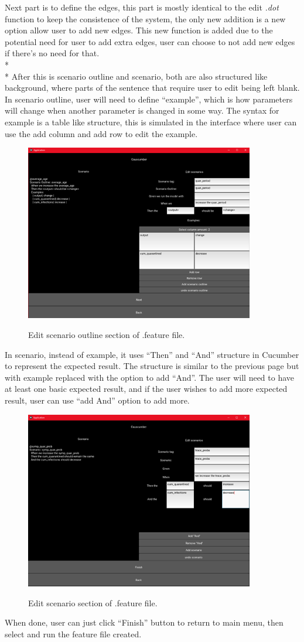 Next part is to define the edges, this part is mostly identical to the edit \textsl{.dot} function to keep the consistence of the system, the only new addition is a new option allow user to add new edges. This new function is added due to the potential need for user to add extra edges, user can choose to not add new edges if there’s no need for that.\\*\\*
After this is scenario outline and scenario, both are also structured like background, where parts of the sentence that require user to edit being left blank. In scenario outline, user will need to define “example”, which is how parameters will change when another parameter is changed in some way. The syntax for example is a table like structure, this is simulated in the interface where user can use the add column and add row to edit the example. 
\begin{figure}[H]
	\centering
	\includegraphics[width=10cm]{figures/editFeature2Screen.png}\\
	\caption{Edit scenario outline section of .feature file.}
	\label{fig:figure17}
\end{figure}
In scenario, instead of example, it uses “Then” and “And” structure in Cucumber to represent the expected result. The structure is similar to the previous page but with example replaced with the option to add “And”. The user will need to have at least one basic expected result, and if the user wishes to add more expected result, user can use “add And” option to add more. 
\begin{figure}[H]
	\centering
	\includegraphics[width=10cm]{figures/editFeature3Screen.png}\\
	\caption{Edit scenario section of .feature file.}
	\label{fig:figure18}
\end{figure}
When done, user can just click “Finish” button to return to main menu, then select and run the feature file created.








